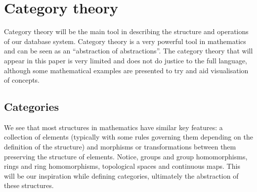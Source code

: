 \section{Category theory}
Category theory will be the main tool in describing the structure and operations
of our database system. Category theory is a very powerful tool in mathematics
and can be seen as an ``abstraction of abstractions''. The category theory that
will appear in this paper is very limited and does not do justice to the full
language, although some mathematical examples are presented to try and aid
visualisation of concepts.

\subsection{Categories}
\theoremstyle{definition}\newtheorem*{categorydef}{Category}
We see that most structures in mathematics have similar key features: a
collection of elements (typically with some rules governing them depending on
the definition of the structure) and morphisms or transformations between them
preserving the structure of elements. Notice, groups and group homomorphisms,
rings and ring homomorphisms, topological spaces and continuous maps. This will
be our inspiration while defining categories, ultimately the abstraction of
these structures. 
